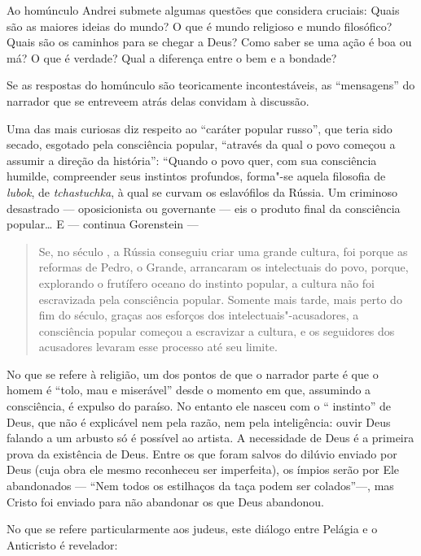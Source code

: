 Ao homúnculo Andrei submete algumas questões que considera cruciais: Quais são
as maiores ideias do mundo? O que é mundo religioso e mundo filosófico?
Quais são os caminhos para se chegar a Deus? Como saber se uma ação é
boa ou má? O que é verdade? Qual a diferença entre o bem e a bondade?

Se as respostas do homúnculo são teoricamente incontestáveis, as
``mensagens'' do narrador que se entreveem atrás delas convidam à
discussão.

Uma das mais curiosas diz respeito ao ``caráter popular russo'', que
teria sido secado, esgotado pela consciência popular, ``através da qual
o povo começou a assumir a direção da história'': ``Quando o povo quer,
com sua consciência humilde, compreender seus instintos profundos,
forma"-se aquela filosofia de \emph{lubok}, de \emph{tchastuchka}, à qual
se curvam os eslavófilos da Rússia. Um criminoso desastrado ---
oposicionista ou governante --- eis o produto final da consciência
popular\ldots{} E --- continua Gorenstein ---

\begin{quote}
Se, no século , a Rússia conseguiu criar uma grande
cultura, foi porque as reformas de Pedro, o Grande, arrancaram os
intelectuais do povo, porque, explorando o frutífero oceano do instinto
popular, a cultura não foi escravizada pela consciência popular. Somente
mais tarde, mais perto do fim do século, graças aos esforços dos
intelectuais"-acusadores, a consciência popular começou a escravizar a
cultura, e os seguidores dos acusadores levaram esse processo até seu
limite.
\end{quote}

No que se refere à religião, um dos pontos de que o narrador parte é que
o homem é ``tolo, mau e miserável'' desde o momento em que, assumindo a
consciência, é expulso do paraíso. No entanto ele nasceu com o ``
instinto'' de Deus, que não é explicável nem pela razão, nem pela
inteligência: ouvir Deus falando a um arbusto só é possível ao artista.
A necessidade de Deus é a primeira prova da existência de Deus. Entre os
que foram salvos do dilúvio enviado por Deus (cuja obra ele mesmo
reconheceu ser imperfeita), os ímpios serão por Ele abandonados ---
``Nem todos os estilhaços da taça podem ser colados''---, mas Cristo
foi enviado para não abandonar os que Deus abandonou.

No que se refere particularmente aos judeus, este diálogo entre Pelágia
e o Anticristo é revelador:

